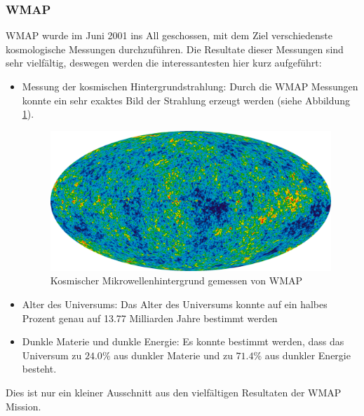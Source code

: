 \subsubsection{\ac{WMAP}}
\ac{WMAP} wurde im Juni 2001 ins All geschossen, mit dem Ziel verschiedenste 
kosmologische Messungen durchzuführen.
Die Resultate dieser Messungen sind sehr vielfältig, deswegen werden die 
interessantesten hier kurz aufgeführt:
\begin{itemize}
	\item Messung der kosmischen Hintergrundstrahlung: Durch die \ac{WMAP} 
	Messungen konnte ein sehr exaktes Bild der Strahlung erzeugt werden (siehe 
	Abbildung \ref{fig:CMB_WMAP}).
	\begin{figure}
		\includegraphics[width=\linewidth]{cmb/images/CMB_WMAP.png}
		\caption{Kosmischer Mikrowellenhintergrund gemessen von \ac{WMAP}}
		\label{fig:CMB_WMAP}
	\end{figure}
	\item Alter des Universums: Das Alter des Universums konnte auf ein halbes 
	Prozent genau auf 13.77 Milliarden Jahre bestimmt werden
	\item Dunkle Materie und dunkle Energie: Es konnte bestimmt werden, dass 
	das Universum zu $24.0 \%$ aus dunkler Materie und zu $71.4\%$ aus 
	dunkler Energie besteht.
\end{itemize}
Dies ist nur ein kleiner Ausschnitt aus den vielfältigen Resultaten der 
\ac{WMAP} Mission. \cite{cmb:WMAP}

